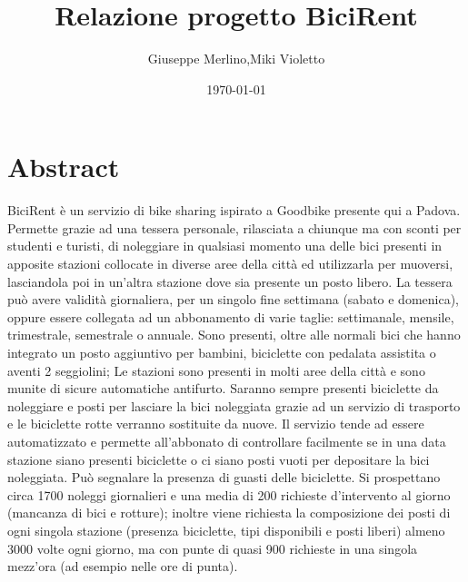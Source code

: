 \documentclass[a4paper,twoside]{article}
\author{Giuseppe Merlino,Miki Violetto}
\title{Relazione progetto BiciRent}
\date{\today}
\begin{document}
\maketitle

\newpage
\tableofcontents
\newpage


\section{Abstract}
BiciRent è un servizio di bike sharing ispirato a Goodbike presente qui a Padova.\newline
Permette grazie ad una tessera personale, rilasciata a chiunque ma con sconti per studenti e turisti, di noleggiare in qualsiasi momento una delle bici presenti in apposite stazioni collocate in diverse aree della città ed utilizzarla per muoversi, lasciandola poi in un'altra stazione dove sia presente un posto libero.\newline
La tessera può avere validità giornaliera, per un singolo fine settimana (sabato e domenica), oppure essere collegata ad un abbonamento di varie taglie: settimanale, mensile, trimestrale, semestrale o  annuale.\newline
Sono presenti, oltre alle normali bici che hanno integrato un posto aggiuntivo per bambini, biciclette con pedalata assistita o aventi 2 seggiolini;\newline
Le stazioni sono presenti in molti aree della città e sono munite di sicure automatiche antifurto. Saranno sempre presenti biciclette da noleggiare e posti per lasciare la bici noleggiata grazie ad un servizio di trasporto e le biciclette rotte verranno sostituite da nuove.\newline
Il servizio tende ad essere automatizzato e permette all'abbonato di controllare facilmente se in una data stazione siano presenti biciclette o ci siano posti vuoti per depositare la bici noleggiata. Può segnalare la presenza di guasti delle biciclette.\newline
Si prospettano circa 1700 noleggi giornalieri e una media di 200 richieste d'intervento al giorno (mancanza di bici e rotture); inoltre viene richiesta la composizione dei posti di ogni singola stazione (presenza biciclette, tipi disponibili e posti liberi) almeno 3000 volte ogni giorno, ma con punte di quasi 900 richieste in una singola mezz'ora (ad esempio nelle ore di punta).
\end{document}
